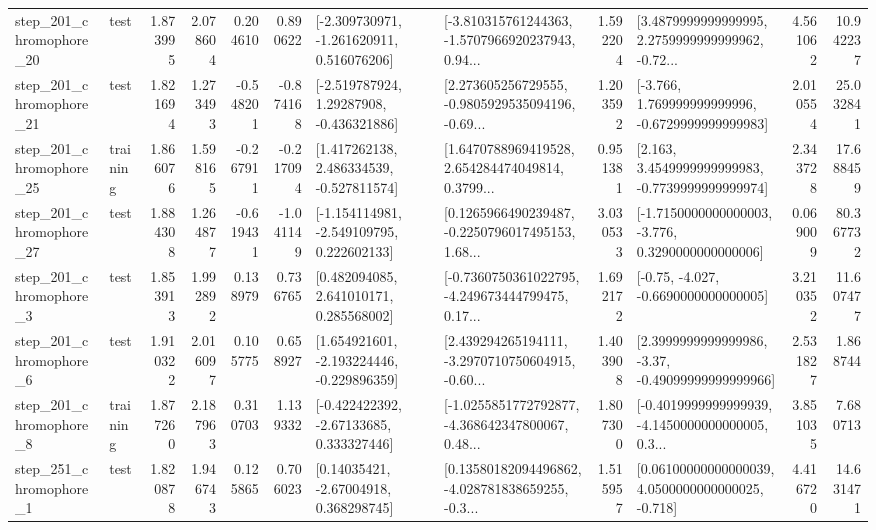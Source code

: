 \begin{tabular}{llrrrrllrlrr}
  step\_201\_chromophore\_20 &      test &      1.873995 &    2.078604 &      0.204610 &  0.890622 &   [-2.309730971, -1.261620911, 0.516076206] &  [-3.810315761244363, -1.5707966920237943, 0.94... &       1.592204 &  [3.4879999999999995, 2.2759999999999962, -0.72... &            4.561062 &         10.942237 \\
  step\_201\_chromophore\_21 &      test &      1.821694 &    1.273493 &     -0.548201 & -0.874168 &    [-2.519787924, 1.29287908, -0.436321886] &  [2.273605256729555, -0.9805929535094196, -0.69... &       1.203592 &   [-3.766, 1.769999999999996, -0.6729999999999983] &            2.010554 &         25.032841 \\
  step\_201\_chromophore\_25 &  training &      1.866076 &    1.598165 &     -0.267911 & -0.217094 &    [1.417262138, 2.486334539, -0.527811574] &  [1.6470788969419528, 2.654284474049814, 0.3799... &       0.951381 &   [2.163, 3.4549999999999983, -0.7739999999999974] &            2.343728 &         17.688459 \\
  step\_201\_chromophore\_27 &      test &      1.884308 &    1.264877 &     -0.619431 & -1.041149 &   [-1.154114981, -2.549109795, 0.222602133] &  [0.1265966490239487, -0.2250796017495153, 1.68... &       3.030533 &  [-1.7150000000000003, -3.776, 0.3290000000000006] &            0.069009 &         80.367732 \\
   step\_201\_chromophore\_3 &      test &      1.853913 &    1.992892 &      0.138979 &  0.736765 &     [0.482094085, 2.641010171, 0.285568002] &  [-0.7360750361022795, -4.249673444799475, 0.17... &       1.692172 &               [-0.75, -4.027, -0.6690000000000005] &            3.210352 &         11.607477 \\
   step\_201\_chromophore\_6 &      test &      1.910322 &    2.016097 &      0.105775 &  0.658927 &   [1.654921601, -2.193224446, -0.229896359] &  [2.439294265194111, -3.2970710750604915, -0.60... &       1.403908 &  [2.3999999999999986, -3.37, -0.49099999999999966] &            2.531827 &          1.868744 \\
   step\_201\_chromophore\_8 &  training &      1.877260 &    2.187963 &      0.310703 &  1.139332 &    [-0.422422392, -2.67133685, 0.333327446] &  [-1.0255851772792877, -4.368642347800067, 0.48... &       1.807300 &  [-0.4019999999999939, -4.1450000000000005, 0.3... &            3.851035 &          7.680713 \\
   step\_251\_chromophore\_1 &      test &      1.820878 &    1.946743 &      0.125865 &  0.706023 &      [0.14035421, -2.67004918, 0.368298745] &  [0.13580182094496862, -4.028781838659255, -0.3... &       1.515957 &  [0.06100000000000039, 4.0500000000000025, -0.718] &            4.416720 &         14.631471 \\

\end{tabular}
